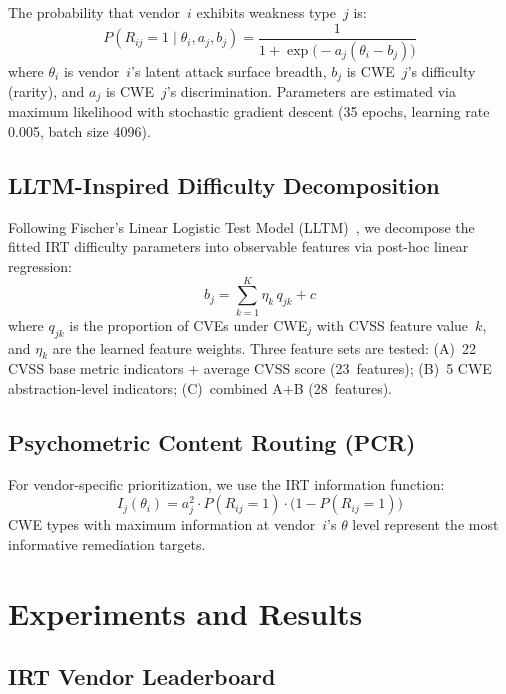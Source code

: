 \documentclass[11pt,a4paper]{article}
\begin{document}
The probability that vendor~$i$ exhibits weakness type~$j$ is:
\begin{equation}
P(R_{ij} = 1 \mid \theta_i, a_j, b_j) = \frac{1}{1 + \exp\bigl(-a_j(\theta_i - b_j)\bigr)}
\label{eq:2pl}
\end{equation}
where $\theta_i$ is vendor~$i$'s latent attack surface breadth, $b_j$ is CWE~$j$'s difficulty (rarity), and $a_j$ is CWE~$j$'s discrimination.
Parameters are estimated via maximum likelihood with stochastic gradient descent (35 epochs, learning rate 0.005, batch size 4096).

\subsection{LLTM-Inspired Difficulty Decomposition}

Following Fischer's Linear Logistic Test Model (LLTM)~\citep{fischer1973}, we decompose the fitted IRT difficulty parameters into observable features via post-hoc linear regression:
\begin{equation}
b_j = \sum_{k=1}^{K} \eta_k\, q_{jk} + c
\label{eq:lltm}
\end{equation}
where $q_{jk}$ is the proportion of CVEs under CWE$_j$ with CVSS feature value~$k$, and $\eta_k$ are the learned feature weights.
Three feature sets are tested: (A)~22 CVSS base metric indicators + average CVSS score (23~features); (B)~5 CWE abstraction-level indicators; (C)~combined A+B (28~features).

\subsection{Psychometric Content Routing (PCR)}

For vendor-specific prioritization, we use the IRT information function:
\begin{equation}
I_j(\theta_i) = a_j^2 \cdot P(R_{ij}=1) \cdot \bigl(1 - P(R_{ij}=1)\bigr)
\label{eq:pcr}
\end{equation}
CWE types with maximum information at vendor~$i$'s $\theta$ level represent the most informative remediation targets.

\section{Experiments and Results}

\subsection{IRT Vendor Leaderboard}
\end{document}
